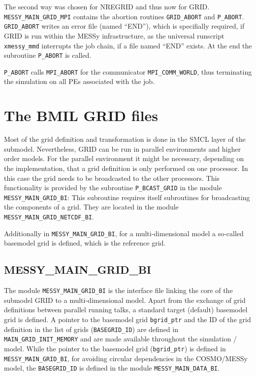 \documentclass[11pt,twoside]{article}
\begin{document}
The second way was chosen for NREGRID and thus now for GRID. 
\verb|MESSY_MAIN_GRID_MPI| contains the abortion routines \verb|GRID_ABORT|
and \verb|P_ABORT|. \verb|GRID_ABORT| writes an error file (named
 ``END''),  which is
specifially required, if GRID is run within the MESSy infrastructure, as the
universal runscript \verb|xmessy_mmd| interrupts the job chain, if a file
named ``END'' exists.
At the end the subroutine \verb|P_ABORT| is called.

\verb|P_ABORT| calls \verb|MPI_ABORT| for the communicator 
\verb|MPI_COMM_WORLD|, thus terminating the simulation on all PEs associated
with the job.

\cleardoublepage

\section{The BMIL GRID files \label{BMIL}}
Most of the grid definition and transformation is done in the SMCL layer of
the submodel. Nevertheless, GRID can be run in parallel environments and
higher order models. For the parallel environment it might be necessary,
depending on the implementation, that a grid definition is only performed on one
processor. In this case the grid needs to be broadcasted to the other
processors. This functionality is provided by the
subroutine \verb|P_BCAST_GRID| 
in the module \verb|MESSY_MAIN_GRID_BI|: This subroutine requires itself
subroutines for broadcasting the components of a grid. 
They are located in the module \verb|MESSY_MAIN_GRID_NETCDF_BI|.

Additionally in \verb|MESSY_MAIN_GRID_BI|, for a multi-dimensional
model a so-called basemodel grid is defined, which is the reference grid.
\subsection{MESSY\_MAIN\_GRID\_BI\label{MMGBI}}
The module \verb|MESSY_MAIN_GRID_BI| is the interface file linking the
core of the submodel GRID to a multi-dimensional model.
Apart from the exchange of grid definitions between parallel running
talks, a standard target (default) basemodel
grid is defined. A pointer to the basemodel grid \verb|bgrid_ptr| and the ID
of the grid definition in the list of grids (\verb|BASEGRID_ID|) are defined
in \verb|MAIN_GRID_INIT_MEMORY| and are made available 
throughout the simulation / model. While the pointer to the basemodel
grid (\verb|bgrid_ptr|) is defined in \verb|MESSY_MAIN_GRID_BI|, for
avoiding circular dependencies in the COSMO/MESSy model,
the \verb|BASEGRID_ID| is defined in the module \verb|MESSY_MAIN_DATA_BI|. 
\end{document}
